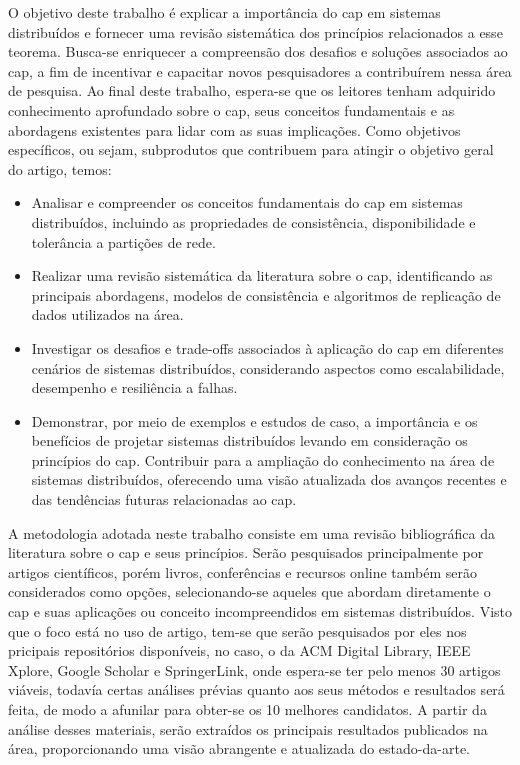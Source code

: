 O objetivo deste trabalho é explicar a importância do \gls{cap} em sistemas distribuídos e fornecer uma revisão sistemática dos princípios relacionados a esse teorema. Busca-se enriquecer a compreensão dos desafios e soluções associados ao \gls{cap}, a fim de incentivar e capacitar novos pesquisadores a contribuírem nessa área de pesquisa. Ao final deste trabalho, espera-se que os leitores tenham adquirido conhecimento aprofundado sobre o \gls{cap}, seus conceitos fundamentais e as abordagens existentes para lidar com as suas implicações. Como objetivos específicos, ou sejam, subprodutos que contribuem para atingir o objetivo geral do artigo, temos:
\begin{itemize}
    \item Analisar e compreender os conceitos fundamentais do \gls{cap} em sistemas distribuídos, incluindo as propriedades de consistência, disponibilidade e tolerância a partições de rede.
    \item Realizar uma revisão sistemática da literatura sobre o \gls{cap}, identificando as principais abordagens, modelos de consistência e algoritmos de replicação de dados utilizados na área.
    \item Investigar os desafios e trade-offs associados à aplicação do \gls{cap} em diferentes cenários de sistemas distribuídos, considerando aspectos como escalabilidade, desempenho e resiliência a falhas.
    \item Demonstrar, por meio de exemplos e estudos de caso, a importância e os benefícios
de projetar sistemas distribuídos levando em consideração os princípios do \gls{cap}.
Contribuir para a ampliação do conhecimento na área de sistemas distribuídos, oferecendo uma visão atualizada dos avanços recentes e das tendências futuras relacionadas ao \gls{cap}.
\end{itemize}

A metodologia adotada neste trabalho consiste em uma revisão bibliográfica da literatura sobre o \gls{cap} e seus princípios. Serão pesquisados principalmente por artigos científicos, porém  livros, conferências e recursos online também serão considerados como opções, selecionando-se aqueles que abordam diretamente o \gls{cap} e suas aplicações ou conceito incompreendidos em sistemas distribuídos. Visto que o foco está no uso de artigo, tem-se que serão pesquisados por eles nos pricipais repositórios disponíveis, no caso, o da ACM Digital Library, IEEE Xplore, Google Scholar e SpringerLink, onde espera-se ter pelo menos 30 artigos viáveis, todavía certas análises prévias quanto aos seus métodos e resultados será feita, de modo a afunilar para obter-se os 10 melhores candidatos. A partir da análise desses materiais, serão extraídos os principais resultados publicados na área, proporcionando uma visão abrangente e atualizada do estado-da-arte.

